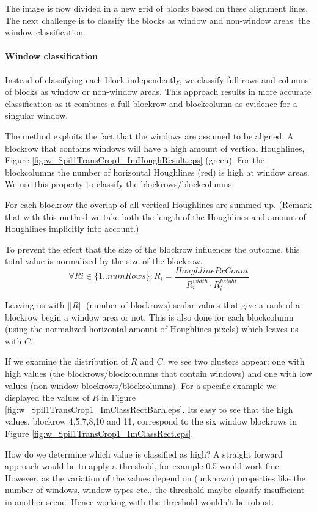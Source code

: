 The image is now divided in a new grid of blocks based on these
alignment lines. The next challenge is to classify the blocks as window and
non-window areas: the window classification.

\paragraph{Window classification}
Instead of classifying each block independently, we classify full rows and
columns of blocks as window or non-window areas.  This approach results in more accurate
classification as it combines a full blockrow and blockcolumn as evidence for a singular
window. 

The method exploits the fact that the windows are assumed to be
aligned.
A blockrow that contains windows will have a high amount of vertical
Houghlines, Figure \ref{fig:w_Spil1TransCrop1_ImHoughResult.eps}
(green). For the blockcolumns the number of horizontal Houghlines
 (red) is high at window areas.  We use this property to classify 
 the blockrows/blockcolumns. 

For each blockrow the overlap of all vertical Houghlines are summed up.
(Remark that with this method we take both the length of the Houghlines and
amount of Houghlines implicitly into account.)

To prevent the effect that the size of the blockrow influences the outcome, this total value
is normalized by the size of the blockrow.
\[\forall Ri\in \{1..numRows\} : R_i = \frac{HoughlinePxCount}{R_i^{width} \cdot R_i^{height}}\]

Leaving us with $||R||$ (number of blockrows) scalar values that give a rank of a blockrow begin a window area or not.
This is also done for each blockcolumn (using the normalized horizontal amount of
Houghlines pixels) which leaves us with $C$.

If we examine the distribution of $R$ and $C$, we see two clusters appear: one with
high values (the blockrows/blockcolumns that contain windows) and one with low values (non window
blockrows/blockcolumns). For a specific example we displayed the values of $R$ in Figure \ref{fig:w_Spil1TransCrop1_ImClassRectBarh.eps}.
Its easy to see that the high values, blockrow 4,5,7,8,10 and 11, correspond to the
six window blockrows in Figure \ref{fig:w_Spil1TransCrop1_ImClassRect.eps}.

How do we determine which value is classified as high?  A straight forward
approach would be to apply a threshold, for example 0.5 would work fine.
However, as the variation of the values depend on (unknown) properties like the
number of windows, window types etc., the threshold maybe classify insufficient
in another scene.  Hence working with the threshold wouldn't be robust. 

